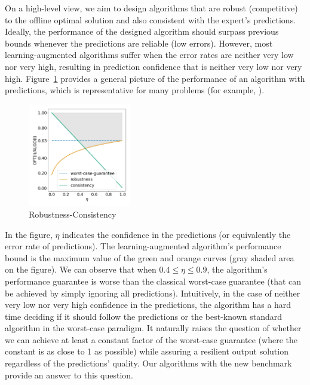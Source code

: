 On a high-level view, we aim to design algorithms that are robust (competitive) to the offline optimal solution and also consistent with the expert's predictions. Ideally, the performance of the designed algorithm should surpass previous bounds whenever the predictions are reliable (low errors).
However, most learning-augmented algorithms suffer when the error rates are neither very low nor very high, resulting in prediction confidence that is neither very low nor very high.
Figure~\ref{fig:robustness-consistency} provides a general picture of the performance of an algorithm with predictions, which is representative for many problems (for example, \cite{BamasMaggoriSvensson20:primal-dual-method,KeviNguyen23:Primal-Dual-Algorithms}).

\begin{figure}
	\vspace{-0.4cm}
    \centering
    \includegraphics[width=0.4\textwidth]{./Img/consistency_robustness.png}
    \vspace{-0.8cm}
    \caption{Robustness-Consistency}
    \label{fig:robustness-consistency}
    \vspace{-0.3cm}
\end{figure}

In the figure, $\eta$ indicates the confidence in the predictions (or equivalently the error rate of predictions). The learning-augmented algorithm's performance bound is the maximum value of the green and orange curves (gray shaded area on the figure). We can observe that when $0.4 \leq \eta \leq 0.9$,
the algorithm's performance guarantee is worse than the classical worst-case guarantee (that can be achieved by simply ignoring all predictions).
Intuitively, in the case of neither very low nor very high confidence in the predictions, the algorithm has a hard time deciding if it should follow the predictions or the best-known standard algorithm in the worst-case paradigm.
It naturally raises the question of whether we can achieve at least a constant factor of the worst-case guarantee (where the constant is as close to 1 as possible) while assuring a resilient output solution regardless of the predictions' quality.
Our algorithms with the new benchmark provide an answer to this question.






